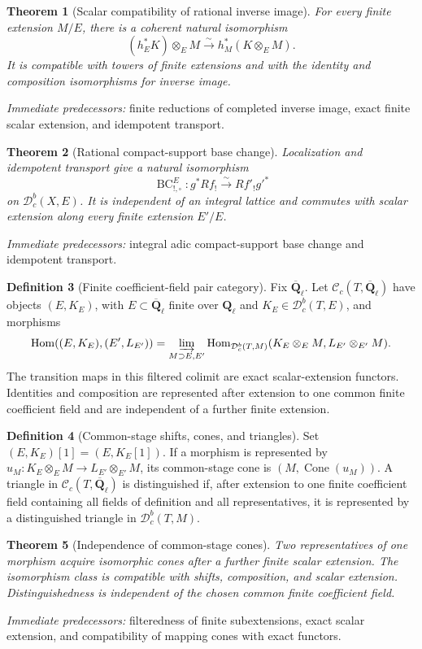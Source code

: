 \documentclass[10pt]{article}
\newtheorem{theorem}{Theorem}[section]
\theoremstyle{definition}
\newtheorem{definition}[theorem]{Definition}
\newcommand{\Ql}{\mathbf Q_\ell}
\newcommand{\Qlb}{\overline{\mathbf Q}_\ell}
\newcommand{\Dbc}{\mathcal D^b_c}
\newcommand{\Hom}{\operatorname{Hom}}
\newcommand{\pred}[1]{\par\smallskip\begingroup\footnotesize\raggedright
\emph{Immediate predecessors:} #1.\par\endgroup}
\begin{document}
\begin{theorem}[Scalar compatibility of rational inverse image]
For every finite extension \(M/E\), there is a coherent natural
isomorphism
\[
 (h_E^*K)\otimes_EM\xrightarrow{\sim}
 h_M^*(K\otimes_EM).
\]
It is compatible with towers of finite extensions and with the identity
and composition isomorphisms for inverse image.
\end{theorem}
\pred{finite reductions of completed inverse image, exact finite scalar extension, and idempotent transport}

\begin{theorem}[Rational compact-support base change]
Localization and idempotent transport give a natural isomorphism
\[
 \operatorname{BC}^{E}_{!,\square}:
 g^*Rf_!\xrightarrow{\sim}Rf'_!g'^*
\]
on \(\Dbc(X,E)\).  It is independent of an integral lattice and commutes
with scalar extension along every finite extension \(E'/E\).
\end{theorem}
\pred{integral adic compact-support base change and idempotent transport}

\begin{definition}[Finite coefficient-field pair category]
Fix \(\Qlb\).  Let \(\mathcal C_c(T,\Qlb)\) have objects
\((E,K_E)\), with \(E\subset\Qlb\) finite over \(\Ql\) and
\(K_E\in\Dbc(T,E)\), and morphisms
\[
 \Hom((E,K_E),(E',L_{E'}))=
 \varinjlim_{M\supset E,E'}
 \Hom_{\Dbc(T,M)}
 (K_E\otimes_EM,L_{E'}\otimes_{E'}M).
\]
The transition maps in this filtered colimit are exact scalar-extension
functors.  Identities and composition are represented after extension to
one common finite coefficient field and are independent of a further finite extension.
\end{definition}

\begin{definition}[Common-stage shifts, cones, and triangles]
Set \((E,K_E)[1]=(E,K_E[1])\).  If a morphism is represented by
\(u_M:K_E\otimes_EM\to L_{E'}\otimes_{E'}M\), its common-stage cone is
\((M,\operatorname{Cone}(u_M))\).  A triangle in
\(\mathcal C_c(T,\Qlb)\) is distinguished if, after extension to one
finite coefficient field containing all fields of definition and all representatives,
it is represented by a distinguished triangle in \(\Dbc(T,M)\).
\end{definition}

\begin{theorem}[Independence of common-stage cones]
Two representatives of one morphism acquire isomorphic cones after a
further finite scalar extension.  The isomorphism class is compatible with
shifts, composition, and scalar extension.  Distinguishedness is
independent of the chosen common finite coefficient field.
\end{theorem}
\pred{filteredness of finite subextensions, exact scalar extension, and compatibility of mapping cones with exact functors}
\end{document}
